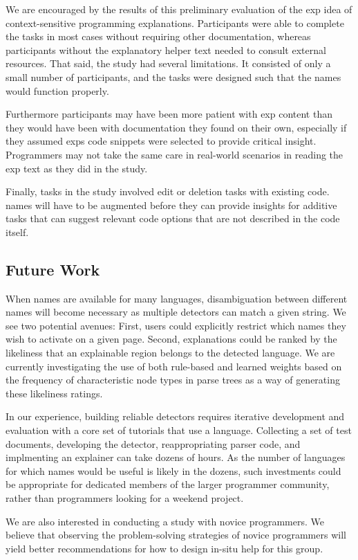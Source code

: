 We are encouraged by the results of this preliminary evaluation of the \gls{exp} idea of context-sensitive programming explanations.
Participants were able to complete the tasks in most cases without requiring other documentation, whereas participants without the explanatory helper text needed to consult external resources.
That said, the study had several limitations.  It consisted of only a small number of participants, and the tasks were designed such that the \Glspl{name} would function properly. 

Furthermore participants may have been more patient with \gls{exp} content than they would have been with documentation they found on their own, especially if they assumed \glspl{exp} code snippets were selected to provide critical insight.
Programmers may not take the same care in real-world scenarios in reading the \gls{exp} text as they did in the study.

Finally, tasks in the study involved edit or deletion tasks with existing code.
\Glspl{name} will have to be augmented before they can provide insights for additive tasks that can suggest relevant code options that are not described in the code itself.

\subsection{Future Work}

\begin{changes}
    When \Glspl{name} are available for many languages, disambiguation between different \Glspl{name} will become necessary as multiple detectors can match a given string.
We see two potential avenues: First, users could explicitly restrict which \Glspl{name} they wish to activate on a given page.
Second, explanations could be ranked by the likeliness that an explainable region belongs to the detected language.
We are currently investigating the use of both rule-based and learned weights based on the frequency of characteristic node types in parse trees as a way of generating these likeliness ratings.
\end{changes}

\begin{changes}
In our experience, building reliable detectors requires iterative development and evaluation with a core set of tutorials that use a language.
Collecting a set of test documents, developing the detector, reappropriating parser code, and implmenting an explainer can take dozens of hours.
As the number of languages for which \Glspl{name} would be useful is likely in the dozens, such investments could be appropriate for dedicated members of the larger programmer community, rather than programmers looking for a weekend project.
\end{changes}
\fi

We are also interested in conducting a study with novice programmers.
We believe that observing the problem-solving strategies of novice programmers will yield better recommendations for how to design in-situ help for this group.
